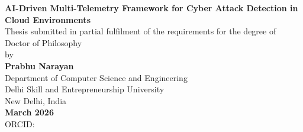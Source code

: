 \begin{titlepage}
    \centering
    {\Large \textbf{AI-Driven Multi-Telemetry Framework for Cyber Attack Detection in Cloud Environments}\\[1.5cm]}
    {\large Thesis submitted in partial fulfilment of the requirements for the degree of Doctor of Philosophy\\[0.5cm]}
    {\large by\\[0.3cm]}
{\Large \textbf{Prabhu Narayan}\\[1.5cm]}
{\large Department of Computer Science and Engineering\\[0.3cm]}
{\large Delhi Skill and Entrepreneurship University}\\[0.3cm]
{\large New Delhi, India}\\[1.5cm]
{\large \textbf{March 2026}}\\[1.5cm]
{\small ORCID: }\par
\end{titlepage}
\cleardoublepage
